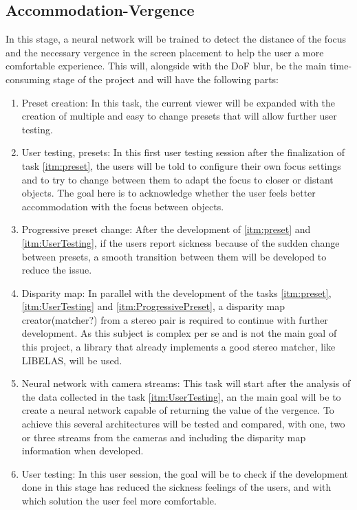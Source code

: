 \documentclass[10pt,a4paper,twocolumn,twoside]{article}
\begin{document}
\subsection{Accommodation-Vergence}
\label{subsec:vergence}
In this stage, a neural network will be trained to detect the distance of the focus and the necessary vergence in the screen placement to help the user a more comfortable experience.
This will, alongside with the DoF blur, be the main time-consuming stage of the project and will have the following parts:
\begin{enumerate}
	\item \label{itm:preset}  Preset creation: In this task, the current viewer will be expanded with the creation of multiple and easy to change presets that will allow further user testing.
	
	\item \label{itm:UserTesting} User testing, presets: In this first user testing session after the finalization of task \ref{itm:preset}, the users will be told to configure their own focus settings and to try to change between them to adapt the focus to closer or distant objects. The goal here is to acknowledge whether the user feels better accommodation with the focus between objects.
	
	\item \label{itm:ProgressivePreset} Progressive preset change: After the development of \ref{itm:preset} and \ref{itm:UserTesting}, if the users report sickness because of the sudden change between presets, a smooth transition between them will be developed to reduce the issue. 
	
	\item Disparity map: In parallel with the development of the tasks \ref{itm:preset}, \ref{itm:UserTesting} and \ref{itm:ProgressivePreset}, a disparity map creator(matcher?) from a stereo pair is required to continue with further development. As this subject is complex per se and is not the main goal of this project, a library that already implements a good stereo matcher, like LIBELAS\cite{web:LIBELAS}, will be used. 
	
	\item Neural network with camera streams: This task will start after the analysis of the data collected in the task \ref{itm:UserTesting}, an the main goal will be to create a neural network capable of returning the value of the vergence. To achieve this several architectures will be tested and compared, with one, two or three streams from the cameras and including the disparity map information when developed.
	
	\item User testing: In this user session, the goal will be to check if the development done in this stage has reduced the sickness feelings of the users, and with which solution the user feel more comfortable.
\end{enumerate}
\end{document}
